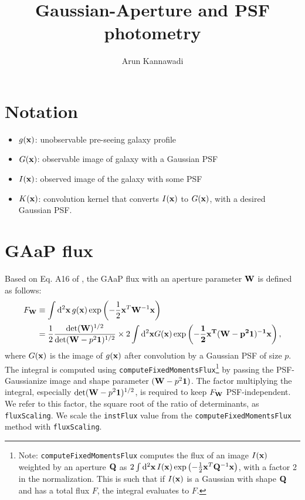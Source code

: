 \documentclass[DM,lsstdraft, authoryear,toc]{lsstdoc}
\title{Gaussian-Aperture and PSF photometry}
\author{%
Arun Kannawadi
}
\date{\vcsDate}
\newcommand{\rmd}{\mathrm{d}^2}
\begin{document}
\maketitle

\section{Notation}
\begin{itemize}
    \item $g({\bf x})$: unobservable pre-seeing galaxy profile
    \item $G({\bf x})$: observable image of galaxy with a Gaussian PSF
    \item $I({\bf x})$: observed image of the galaxy with some PSF
    \item $K({\bf x})$: convolution kernel that converts $I({\bf x})$ to $G({\bf x})$, with a desired Gaussian PSF.
\end{itemize}

\section{GAaP flux}
Based on Eq. A16 of \cite{Kuijken2015}, the GAaP flux with an aperture parameter ${\bf W}$ is defined as follows:
\begin{align}
  F_{\bf W} &\equiv \int\rmd{\bf x}\, g({\bf x})\exp\left( -\frac{1}{2}{\bf x}^T{\bf W}^{-1}{\bf x} \right) \\
        &= \frac{1}{2}\frac{\det({\bf W})^{1/2}}{\det({\bf W}-p^2{\bf 1})^{1/2}}\times 2\int\rmd{\bf x} G(\bf x) \exp\left(-\frac{1}{2}{\bf x}^T({\bf W}-p^2{\bf 1})^{-1}{\bf x}\right),
  \label{eq:A16}
\end{align}
where $G({\bf x})$ is the image of $g({\bf x})$ after convolution by a Gaussian PSF of size $p$.
The integral is computed using \texttt{computeFixedMomentsFlux}\footnote{
  Note: \texttt{computeFixedMomentsFlux} computes the flux of an image $I({\bf x})$ weighted by an aperture ${\bf Q}$ as $2\int\rmd{\bf x}\, I({\bf x})\exp\left(-\frac{1}{2} {\bf x}^T {\bf Q}^{-1}{\bf x}\right)$, with a factor 2 in the normalization. This is such that if $I({\bf x})$ is a Gaussian with shape ${\bf Q}$ and has a total flux $F$, the integral evaluates to $F$.} 
  by passing the PSF-Gaussianize image and shape parameter $({\bf W}-p^2{\bf 1})$.
The factor multiplying the integral, especially $\det({\bf W}-p^2{\bf 1})^{1/2}$, is required to keep $F_{\bf W}$ PSF-independent.
We refer to this factor, the square root of the ratio of determinants, as \texttt{fluxScaling}. We scale the \texttt{instFlux} value from the \texttt{computeFixedMomentsFlux} method with \texttt{fluxScaling}.
\end{document}
